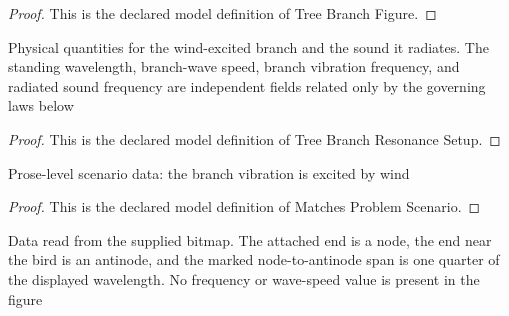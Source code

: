 \begin{proof}
  This is the declared model definition of Tree Branch Figure.
\end{proof}
\begin{definition}
  \label{def:physics:phyx-mini-0213:phyxminiproblems-problemphyxmini0213-treebranchresonancesetup}
  Physical quantities for the wind-excited branch and the sound it radiates. The standing wavelength, branch-wave speed, branch vibration frequency, and radiated sound frequency are independent fields related only by the governing laws below
\end{definition}
\begin{proof}
  This is the declared model definition of Tree Branch Resonance Setup.
\end{proof}
\begin{definition}
  \label{def:physics:phyx-mini-0213:phyxminiproblems-problemphyxmini0213-matchesproblemscenario}
  Prose-level scenario data: the branch vibration is excited by wind
\end{definition}
\begin{proof}
  This is the declared model definition of Matches Problem Scenario.
\end{proof}
\begin{definition}
  \label{def:physics:phyx-mini-0213:phyxminiproblems-problemphyxmini0213-matchessuppliedtreebranchfigure}
  Data read from the supplied bitmap. The attached end is a node, the end near the bird is an antinode, and the marked node-to-antinode span is one quarter of the displayed wavelength. No frequency or wave-speed value is present in the figure
\end{definition}

